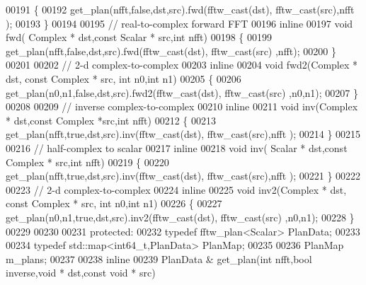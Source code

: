 \begin{DoxyCode}
00191       \{
00192         get\_plan(nfft,\textcolor{keyword}{false},dst,src).fwd(fftw\_cast(dst), fftw\_cast(src),nfft );
00193       \}
00194 
00195       \textcolor{comment}{// real-to-complex forward FFT}
00196       \textcolor{keyword}{inline}
00197       \textcolor{keywordtype}{void} fwd( Complex * dst,\textcolor{keyword}{const} Scalar * src,\textcolor{keywordtype}{int} nfft) 
00198       \{
00199           get\_plan(nfft,\textcolor{keyword}{false},dst,src).fwd(fftw\_cast(dst), fftw\_cast(src) ,nfft);
00200       \}
00201 
00202       \textcolor{comment}{// 2-d complex-to-complex}
00203       \textcolor{keyword}{inline}
00204       \textcolor{keywordtype}{void} fwd2(Complex * dst, \textcolor{keyword}{const} Complex * src, \textcolor{keywordtype}{int} n0,\textcolor{keywordtype}{int} n1)
00205       \{
00206           get\_plan(n0,n1,\textcolor{keyword}{false},dst,src).fwd2(fftw\_cast(dst), fftw\_cast(src) ,n0,n1);
00207       \}
00208 
00209       \textcolor{comment}{// inverse complex-to-complex}
00210       \textcolor{keyword}{inline}
00211       \textcolor{keywordtype}{void} inv(Complex * dst,\textcolor{keyword}{const} Complex  *src,\textcolor{keywordtype}{int} nfft)
00212       \{
00213         get\_plan(nfft,\textcolor{keyword}{true},dst,src).inv(fftw\_cast(dst), fftw\_cast(src),nfft );
00214       \}
00215 
00216       \textcolor{comment}{// half-complex to scalar}
00217       \textcolor{keyword}{inline}
00218       \textcolor{keywordtype}{void} inv( Scalar * dst,\textcolor{keyword}{const} Complex * src,\textcolor{keywordtype}{int} nfft) 
00219       \{
00220         get\_plan(nfft,\textcolor{keyword}{true},dst,src).inv(fftw\_cast(dst), fftw\_cast(src),nfft );
00221       \}
00222 
00223       \textcolor{comment}{// 2-d complex-to-complex}
00224       \textcolor{keyword}{inline}
00225       \textcolor{keywordtype}{void} inv2(Complex * dst, \textcolor{keyword}{const} Complex * src, \textcolor{keywordtype}{int} n0,\textcolor{keywordtype}{int} n1)
00226       \{
00227         get\_plan(n0,n1,\textcolor{keyword}{true},dst,src).inv2(fftw\_cast(dst), fftw\_cast(src) ,n0,n1);
00228       \}
00229 
00230 
00231   \textcolor{keyword}{protected}:
00232       \textcolor{keyword}{typedef} fftw\_plan<Scalar> PlanData;
00233 
00234       \textcolor{keyword}{typedef} std::map<int64\_t,PlanData> PlanMap;
00235 
00236       PlanMap m\_plans;
00237 
00238       \textcolor{keyword}{inline}
00239       PlanData & get\_plan(\textcolor{keywordtype}{int} nfft,\textcolor{keywordtype}{bool} inverse,\textcolor{keywordtype}{void} * dst,\textcolor{keyword}{const} \textcolor{keywordtype}{void} * src)

\end{DoxyCode}

